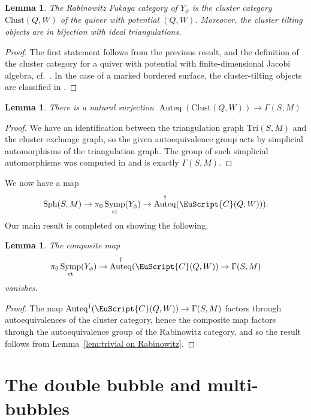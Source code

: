 \documentclass[pdftex]{sigma}
\DeclareMathOperator{\Auteq}{Auteq}
\newcommand{\scrC}{\EuScript{C}}
\DeclareMathOperator{\Symp}{Symp}
\newtheorem{lem}[thm]{Lemma}
\theoremstyle{definition}
\numberwithin{equation}{section}
\begin{document}
\begin{lem}
The Rabinowitz Fukaya category of $Y_{\phi}$ is the cluster category $\mathrm{Clust}(Q,W)$ of the quiver with potential $(Q,W)$. Moreover, the cluster tilting objects are in bijection with ideal triangulations.
\end{lem}

\begin{proof}
The first statement follows from the previous result, and the definition of the cluster category for a quiver with potential with finite-dimensional Jacobi algebra, cf.~\cite{Amiot}. In the case of a marked bordered surface, the cluster-tilting objects are classified in \cite{Brustle-Zhang}.
\end{proof}

\begin{lem}
There is a natural surjection $\Auteq(\mathrm{Clust}(Q,W)) \longrightarrow \Gamma(S,M)$
\end{lem}

\begin{proof}
We have an identification between the triangulation graph $\mathrm{Tri}(S,M)$ and the cluster exchange graph, so the given autoequivalence group acts by simplicial automorphisms of the triangulation graph. The group of such simplicial automorphisms was computed in \cite{Disarlo} and is exactly $\Gamma(S,M)$.
\end{proof}

We now have a map
\[
\mathrm{Sph}(S,M) \to \pi_0\Symp_{\rm ct}(Y_{\phi}) \to \Auteq^{\dagger}(\scrC(Q,W))).
\]
Our main result is completed on showing the following.

\begin{lem}
The composite map
\[
\pi_0\Symp_{\rm ct}(Y_{\phi}) \to \Auteq^{\dagger}(\scrC(Q,W)) \to \Gamma(S,M)
\]
vanishes.
\end{lem}

\begin{proof}
The map $\Auteq^{\dagger}(\scrC(Q,W)) \to \Gamma(S,M)$ factors through autoequivalences of the cluster category, hence the composite map factors through the autoequivalence group of the Rabinowitz category, and so the result follows from Lemma~\ref{lem:trivial on Rabinowitz}.
\end{proof}

\section{The double bubble and multi-bubbles} \label{sec:double-bubble}
\end{document}

